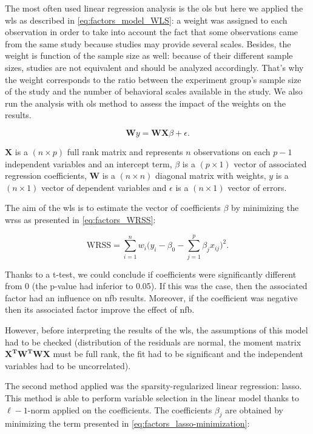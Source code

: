 The most often used linear regression analysis is the \gls{ols} but here we applied the \gls{wls} as described in \cref{eq:factors_model_WLS}: a 
weight was assigned to each observation in order to take into account the fact that some observations came from the same study because studies 
may provide several scales. Besides, the weight is function of the sample size as well: because of their different sample sizes, studies are not 
equivalent and should be analyzed accordingly. That's why the weight corresponds to the ratio between the experiment group's sample size of the study and 
the number of behavioral scales available in the study. We also run the analysis
 with \gls{ols} method to assess the impact of the weights on the results. 

\begin{equation}
\label{eq:factors_model_WLS}
\textbf{W}y = \textbf{WX}\beta + \epsilon .
\end{equation}

$\textbf{X}$ is a $(n \times p)$ full rank matrix and represents $n$ observations on each $p-1$ independent variables and an 
intercept term, $\beta$ is a $(p \times 1)$ vector of associated regression coefficients, $\textbf{W}$ is a $(n \times n)$ diagonal 
matrix with weights, $y$ is a $(n \times 1)$ vector of dependent variables and $\epsilon$ is a $(n \times 1)$ vector of errors.

The aim of the \gls{wls} is to estimate the vector of coefficients $\beta$ by minimizing the \gls{wrss} as presented in \cref{eq:factors_WRSS}:

\begin{equation}
\label{eq:factors_WRSS}
\text{WRSS} = \sum_{i=1}^{n} w_i \Big(y_i - \beta_{0} - \sum_{j=1}^{p}\beta_{j}x_{ij}\Big)^2 .
\end{equation}

Thanks to a t-test, we could conclude if coefficients were significantly different from 0 (the p-value had 
inferior to 0.05). If this was the case, then the associated factor had an influence on \gls{nfb} results. Moreover, if the coefficient was 
negative then its associated factor improve the effect of \gls{nfb}. 

However, before interpreting the results of the \gls{wls}, the assumptions of this model had to be checked (distribution of the residuals are normal,
the moment matrix $\mathbf{{X}^{T}W^{T}WX}$ must be full rank, the fit had to be significant and the independent variables had to be uncorrelated).

The second method applied was the sparsity-regularized linear regression: \gls{lasso}. This method is able to perform variable selection 
in the linear model thanks to $\ell-1$-norm applied on the coefficients. The coefficients $\beta_j$ are obtained by minimizing the term 
presented in \cref{eq:factors_lasso-minimization}:

